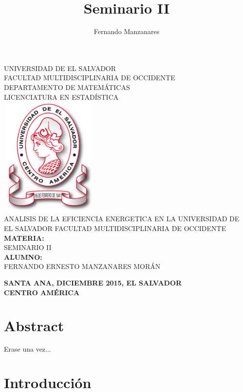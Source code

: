 \documentclass[12pt,letterpaper]{report}
\author{Fernando Manzanares}
\title{Seminario II}
\begin{document}


\thispagestyle{empty}

\begin{center}
UNIVERSIDAD DE EL SALVADOR \\ FACULTAD MULTIDISCIPLINARIA DE OCCIDENTE \\ DEPARTAMENTO DE MATEMÁTICAS \\
LICENCIATURA EN ESTADÍSTICA\\
\bigskip
\includegraphics [width=5cm,height=6cm]{Minerva}
\bigskip
\\ ANALISIS DE LA EFICIENCIA ENERGETICA EN LA UNIVERSIDAD DE EL SALVADOR FACULTAD MULTIDISCIPLINARIA DE OCCIDENTE \\
\bigskip
\textbf{MATERIA:}\\ 
SEMINARIO II\\
\textbf{ALUMNO:}\\ 
FERNANDO ERNESTO MANZANARES MORÁN\\
\bigskip
\bigskip
\bigskip
\bigskip
\bigskip
\bigskip

\textbf{SANTA ANA,    DICIEMBRE 2015,   EL SALVADOR}\\
\textbf{CENTRO AMÉRICA}\\


\end{center}



\tableofcontents 
\thispagestyle{empty}
\chapter*{Abstract}
Erase una vez...
\chapter*{Introducción}
\end{document}
